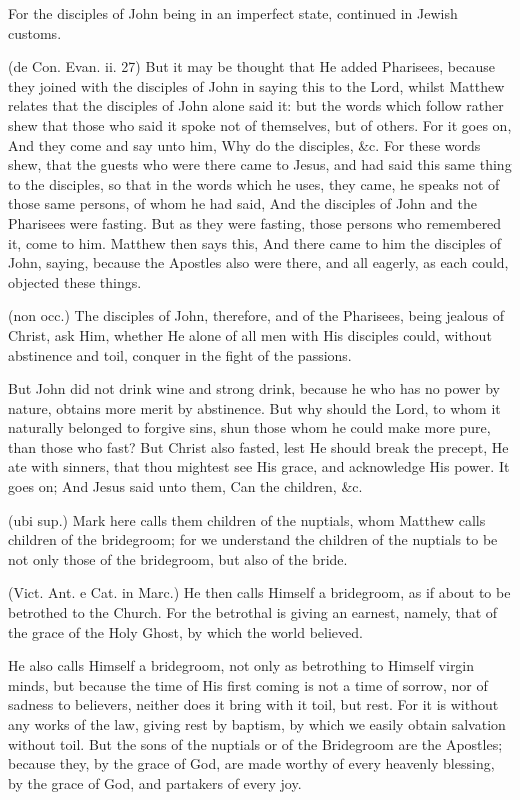  For the disciples of John being in an imperfect state, continued in Jewish customs.

 (de Con. Evan. ii. 27) But it may be thought that He added Pharisees, because they joined with the disciples of John in saying this to the Lord, whilst Matthew relates that the disciples of John alone said it: but the words which follow rather shew that those who said it spoke not of themselves, but of others. For it goes on, And they come and say unto him, Why do the disciples, \&c. For these words shew, that the guests who were there came to Jesus, and had said this same thing to the disciples, so that in the words which he uses, they came, he speaks not of those same persons, of whom he had said, And the disciples of John and the Pharisees were fasting. But as they were fasting, those persons who remembered it, come to him. Matthew then says this, And there came to him the disciples of John, saying, because the Apostles also were there, and all eagerly, as each could, objected these things.

 (non occ.) The disciples of John, therefore, and of the Pharisees, being jealous of Christ, ask Him, whether He alone of all men with His disciples could, without abstinence and toil, conquer in the fight of the passions.

 But John did not drink wine and strong drink, because he who has no power by nature, obtains more merit by abstinence. But why should the Lord, to whom it naturally belonged to forgive sins, shun those whom he could make more pure, than those who fast? But Christ also fasted, lest He should break the precept, He ate with sinners, that thou mightest see His grace, and acknowledge His power. It goes on; And Jesus said unto them, Can the children, \&c.

 (ubi sup.) Mark here calls them children of the nuptials, whom Matthew calls children of the bridegroom; for we understand the children of the nuptials to be not only those of the bridegroom, but also of the bride.

 (Vict. Ant. e Cat. in Marc.) He then calls Himself a bridegroom, as if about to be betrothed to the Church. For the betrothal is giving an earnest, namely, that of the grace of the Holy Ghost, by which the world believed.

 He also calls Himself a bridegroom, not only as betrothing to Himself virgin minds, but because the time of His first coming is not a time of sorrow, nor of sadness to believers, neither does it bring with it toil, but rest. For it is without any works of the law, giving rest by baptism, by which we easily obtain salvation without toil. But the sons of the nuptials or of the Bridegroom are the Apostles; because they, by the grace of God, are made worthy of every heavenly blessing, by the grace of God, and partakers of every joy.

